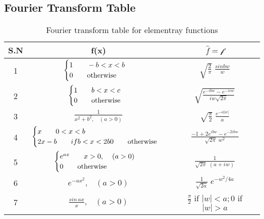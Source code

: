 \message{ !name(ch3_aima331.tex)}\documentclass[aima331_lecturenotes_ku.tex]{subfiles}
\begin{document}
 \subsection{Fourier Transform Table}
 \begin{table}[h]
   \centering
   \begin{tabular}{|c|c|c|}
     \hline
     S.N&f(x)&$\hat{f}=\mathcal{f}$ \\
     \hline
     1& $
        \begin{cases}
          1 \hspace{7mm} -b < x <b \\
          0 \hspace{7mm} \text{otherwise}
        \end{cases}
        $ & $\displaystyle \sqrt{\frac{2}{\pi}} \; \frac{sinbw}{w}$ \\[11mm]
     2& $
        \begin{cases}
          1 \hspace{7mm} b < x <c \\
          0 \hspace{7mm} \text{otherwise}
        \end{cases}
        $ & $\displaystyle \sqrt{\frac{e^{-ibw}-e^{-icw}}{iw\sqrt{2 \pi}}}$ \\[11mm]
     3& $\displaystyle \frac{1}{x^2 + b^2, \;\;\; (a>0)} $ & $\displaystyle \sqrt{\frac{\pi}{2}} \; \frac{e^{-a|w|}}{a}$ \\[11mm]
     4& $
        \begin{cases}
          x \hspace{7mm} 0 < x <b \\
          2x-b \hspace{7mm} if b <x<2b
          0 \hspace{7mm} \text{otherwise}
        \end{cases}
        $ & $\displaystyle \frac{-1 + 2e^{ibw} - e^{-2ibw}}{\sqrt{2\pi}\;w^2}$ \\[11mm]
            5& $
        \begin{cases}
          e^{ax} \hspace{7mm}  x >0, \hspace{4mm} (a > 0)\\
          0 \hspace{7mm} \text{otherwise}
        \end{cases}
               $ & $\displaystyle \frac{1 }{\sqrt{2\pi}\;(a+iw)}$\\[11mm]
     6 & $e^{-ax^{2}}, \;\;\; (a>0)$& $\displaystyle \frac{1}{\sqrt{2a}} \; e^{-w^2/4a}$ \\[11mm]
     7 & $\displaystyle \frac{sin\,ax}{x}, \;\;\; (a>0)$ & $\displaystyle \frac{\pi}{2}$ if $|w|<a; 0$ if $|w|>a$ \\[5mm]
     \hline
   \end{tabular}

   \caption{Fourier transform table for elementray functions}
 \end{table}
\end{document}
